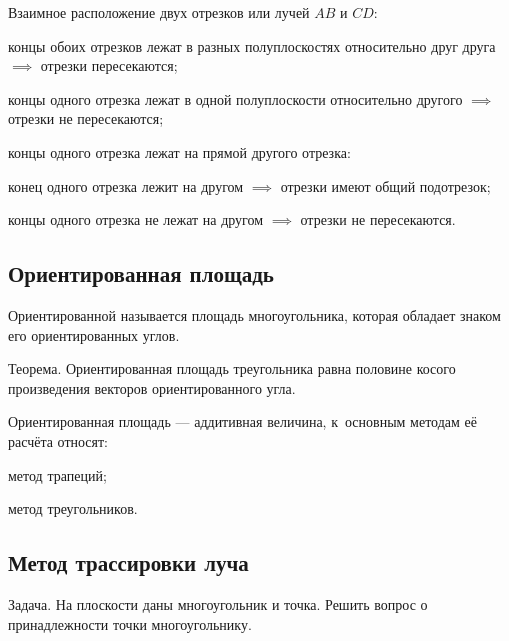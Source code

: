 Взаимное расположение {\ital двух отрезков или лучей} $AB$ и $CD$:

\begin{list*}
\item концы обоих отрезков лежат в {\ital разных} полуплоскостях относительно друг друга $\implies$ отрезки {\bold пересекаются};
\item концы одного отрезка лежат в {\ital одной} полуплоскости относительно другого $\implies$ отрезки {\bold не пересекаются};
\item концы одного отрезка лежат {\ital на} прямой другого отрезка:
\begin{list*}[2]
\item конец одного отрезка лежит {\ital на} другом $\implies$ отрезки имеют {\bold общий подотрезок};
\item концы одного отрезка {\ital не} лежат на другом $\implies$ отрезки {\bold не пересекаются}.
\end{list*}
\end{list*}

\subsection{Ориентированная площадь}

{\bold Ориентированной} называется площадь многоугольника, которая обладает знаком его ориентированных углов.

\begin{theorem}
{\bold Теорема.} Ориентированная площадь треугольника равна половине {\ital косого произведения} векторов ориентированного угла.
\end{theorem}

Ориентированная площадь --- {\ital аддитивная} величина, к~основным методам её расчёта относят:

\begin{list*}
\item метод трапеций;
\item метод треугольников.
\end{list*}

\subsection{Метод трассировки луча}

\begin{theorem}
{\bold Задача.} На плоскости даны многоугольник и точка. Решить вопрос о принадлежности точки многоугольнику.
\end{theorem}

